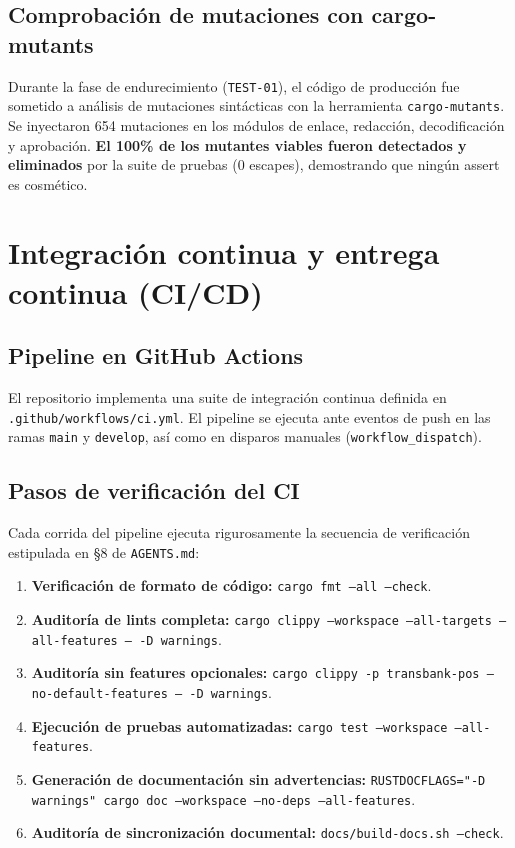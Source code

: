 \documentclass{../../plantilla/raysac-informe}
\begin{document}
\subsection{Comprobación de mutaciones con cargo-mutants}
Durante la fase de endurecimiento (\texttt{TEST-01}), el código de producción fue sometido a análisis de
mutaciones sintácticas con la herramienta \texttt{cargo-mutants}. Se inyectaron 654 mutaciones en los
módulos de enlace, redacción, decodificación y aprobación. \textbf{El 100\% de los mutantes viables fueron
detectados y eliminados} por la suite de pruebas (0 escapes), demostrando que ningún assert es cosmético.

\clearpage
\section{Integración continua y entrega continua (CI/CD)}

\subsection{Pipeline en GitHub Actions}
El repositorio implementa una suite de integración continua definida en \texttt{.github/workflows/ci.yml}.
El pipeline se ejecuta ante eventos de push en las ramas \texttt{main} y \texttt{develop}, así como en
disparos manuales (\texttt{workflow\_dispatch}).

\subsection{Pasos de verificación del CI}
Cada corrida del pipeline ejecuta rigurosamente la secuencia de verificación estipulada en §8 de \texttt{AGENTS.md}:
\begin{enumerate}
  \item \textbf{Verificación de formato de código:} \texttt{cargo fmt --all --check}.
  \item \textbf{Auditoría de lints completa:} \texttt{cargo clippy --workspace --all-targets --all-features -- -D warnings}.
  \item \textbf{Auditoría sin features opcionales:} \texttt{cargo clippy -p transbank-pos --no-default-features -- -D warnings}.
  \item \textbf{Ejecución de pruebas automatizadas:} \texttt{cargo test --workspace --all-features}.
  \item \textbf{Generación de documentación sin advertencias:} \texttt{RUSTDOCFLAGS="-D warnings" cargo doc --workspace --no-deps --all-features}.
  \item \textbf{Auditoría de sincronización documental:} \texttt{docs/build-docs.sh --check}.
\end{enumerate}
\end{document}
